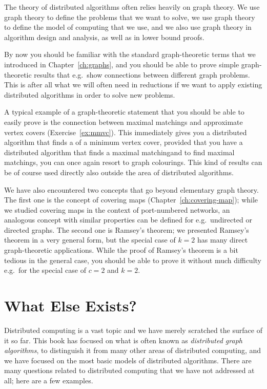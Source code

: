 The theory of distributed algorithms often relies heavily on graph theory. We use graph theory to define the problems that we want to solve, we use graph theory to define the model of computing that we use, and we also use graph theory in algorithm design and analysis, as well as in lower bound proofs.

By now you should be familiar with the standard graph-theoretic terms that we introduced in Chapter~\ref{ch:graphs}, and you should be able to prove simple graph-theoretic results that e.g.\ show connections between different graph problems. This is after all what we will often need in reductions if we want to apply existing distributed algorithms in order to solve new problems.

A typical example of a graph-theoretic statement that you should be able to easily prove is the connection between maximal matchings and approximate vertex covers (Exercise~\ref{ex:mmvc}). This immediately gives you a distributed algorithm that finds a  of a minimum vertex cover, provided that you have a distributed algorithm that finds a maximal matching\mydash and to find maximal matchings, you can once again resort to graph colourings. This kind of results can be of course used directly also outside the area of distributed algorithms.

We have also encountered two concepts that go beyond elementary graph theory. The first one is the concept of covering maps (Chapter~\ref{ch:covering-map}); while we studied covering maps in the context of port-numbered networks, an analogous concept with similar properties can be defined for e.g.\ undirected or directed graphs. The second one is Ramsey's theorem; we presented Ramsey's theorem in a very general form, but the special case of $k = 2$ has many direct graph-theoretic applications. While the proof of Ramsey's theorem is a bit tedious in the general case, you should be able to prove it without much difficulty e.g.\ for the special case of $c = 2$ and $k = 2$.


\section{What Else Exists?}

Distributed computing is a vast topic and we have merely scratched the surface of it so far. This book has focused on what is often known as \emph{distributed graph algorithms}, to distinguish it from many other areas of distributed computing, and we have focused on the most basic models of distributed algorithms. There are many questions related to distributed computing that we have not addressed at all; here are a few examples.


